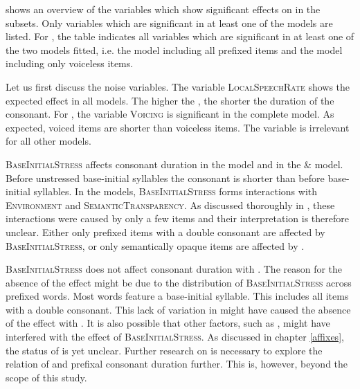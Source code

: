  shows an overview of the variables which show significant effects on  in the subsets. Only variables which are significant in at least one of the  models are listed. For , the table indicates all variables which are significant in at least one of the two  models fitted, i.e. the model including all prefixed items and the model including only voiceless items.







Let us first discuss the noise variables. The variable \textsc{LocalSpeechRate} shows the expected effect in all models.  The higher the , the shorter the duration of the consonant. 
For , the variable \textsc{Voicing} is significant in the complete model. As expected, voiced items are shorter than voiceless items. The variable is irrelevant for all other models.

\textsc{BaseInitialStress} affects consonant duration in the model and in the  \&  model. Before unstressed base-initial syllables the consonant is shorter than before  base-initial syllables. 
In the models, \textsc{BaseInitialStress} forms interactions with \textsc{Environment} and \textsc{SemanticTransparency}. As discussed thoroughly in , these interactions were caused by only a few items and their interpretation is therefore unclear. Either only prefixed items with a double consonant are affected by \textsc{BaseInitialStress}, or only semantically opaque items are affected by .

 \textsc{BaseInitialStress} does not affect consonant duration with . The reason for the absence of the effect might be due to the distribution of \textsc{BaseInitialStress} across prefixed words. Most words feature a  base-initial syllable. This includes all items with a double consonant. This lack of variation in  might have caused the absence of the effect with . It is also possible that other factors, such as , might have interfered with the effect of \textsc{BaseInitialStress}. As discussed in chapter \ref{affixes}, the  status of  is yet unclear. Further research on  is necessary to explore the relation of  and prefixal consonant duration further. This is, however, beyond the scope of this study.

